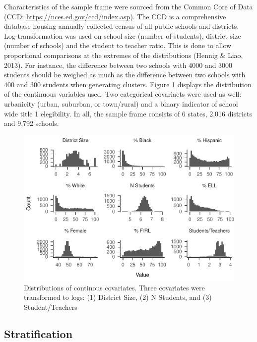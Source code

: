 \documentclass[man,floatsintext]{apa6}
\begin{document}
Characteristics of the sample frame were sourced from the Common Core of Data (CCD; \url{https://nces.ed.gov/ccd/index.asp}). The CCD is a comprehensive database housing annually collected census of all public schools and districts. Log-transformation was used on school size (number of students), district size (number of schools) and the student to teacher ratio. This is done to allow proportional comparisons at the extremes of the distributions (Hennig \& Liao, 2013). For instance, the difference between two schools with 4000 and 3000 students should be weighed as much as the difference between two schools with 400 and 300 students when generating clusters. Figure \ref{fig:plot-dist1} displays the distribution of the continuous variables used. Two categorical covariaets were used as well: urbanicity (urban, suburban, or town/rural) and a binary indicator of school wide title 1 elegibility. In all, the sample frame consists of 6 states, 2,016 districts and 9,792 schools.



\begin{figure}
\centering
\includegraphics{GenSamp-Paper_files/figure-latex/plot-dist1-1.pdf}
\caption{\label{fig:plot-dist1}Distributions of continous covariates. Three covariates were transformed to logs: (1) District Size, (2) N Students, and (3) Student/Teachers}
\end{figure}

\hypertarget{stratification}{%
\subsection{Stratification}\label{stratification}}
\end{document}
